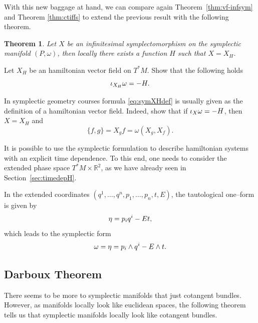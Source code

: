 \documentclass[english,fontsize=11pt,paper=a5,oneside]{scrbook}
\newcommand{\R}{\mathbb{R}}
\let\d\relax
\newcommand{\d}{\mathrm{d}}
\newtheorem{theorem}{Theorem}[chapter]
\theoremstyle{definition}
\newenvironment{example}
  {\pushQED{\qed}\renewcommand{\qedsymbol}{$\lozenge$}\examplex}
  {\popQED\endexamplex}
\newenvironment{exercise}
  {\pushQED{\qed}\renewcommand{\qedsymbol}{$\maltese$}\exercisex}
  {\popQED\endexercisex}
\begin{document}
With this new baggage at hand, we can compare again Theorem~\ref{thm:vf-infsym} and Theorem \ref{thm:ctiffs} to extend the previous result with the following theorem.

\begin{theorem}
  Let $X$ be an infinitesimal symplectomorphism on the symplectic manifold $(P,\omega)$, then locally there exists a function $H$ such that $X = X_H$.
\end{theorem}

\begin{exercise}
  Let $X_H$ be an hamiltonian vector field on $T^*M$.
  Show that the following holds
  \begin{equation}\label{eq:symXHdef}
    \iota_{X_H}\omega = -\d H.
  \end{equation}

  In symplectic geometry courses formula \eqref{eq:symXHdef} is usually given as the definition of a hamiltonian vector field.
  Indeed, show that if $\iota_{X}\omega = -\d H$, then $X=X_H$ and
  \begin{equation}
    \{f,g\} = X_g f = \omega(X_g, X_f).
  \end{equation}
\end{exercise}

\begin{example}[Time dependent hamiltonians]\label{ex:timedepH}
  It is possible to use the symplectic formulation to describe hamiltonian systems with an explicit time dependence.
  To this end, one needs to consider the extended phase space $T^*M\times\R^2$, as we have already seen in Section~\ref{sec:timedepH}.

  In the extended coordinates $(q^1, \ldots, q^n, p_1,\ldots,p_n,t,E)$, the tautological one--form is given by
  \begin{equation}
    \eta = p_i\d q^i -E\d t,
  \end{equation}
  which leads to the symplectic form
  \begin{equation}
    \omega = \d\eta = \d p_i \wedge \d q^i -\d E \wedge \d t.
  \end{equation}
\end{example}

\subsection{Darboux Theorem}

There seems to be more to symplectic manifolds that just cotangent bundles.
However, as manifolds locally look like euclidean spaces, the following theorem tells us that symplectic manifolds locally look like cotangent bundles.
\end{document}
